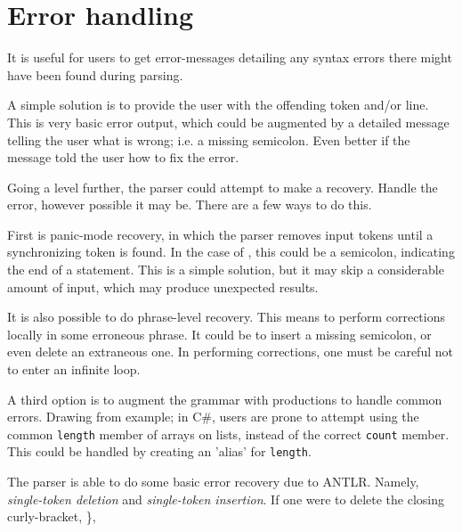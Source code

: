 \section{Error handling}
It is useful for users to get error-messages detailing any syntax errors there might have been found during parsing.

A simple solution is to provide the user with the offending token and/or line. This is very basic error output, which could be augmented by a detailed message telling the user what is wrong; i.e. a missing semicolon. Even better if the message told the user how to fix the error. 

Going a level further, the parser could attempt to make a recovery. Handle the error, however possible it may be. There are a few ways to do this.

First is panic-mode recovery, in which the parser removes input tokens until a synchronizing token is found. In the case of \dazel{}, this could be a semicolon, indicating the end of a statement. This is a simple solution, but it may skip a considerable amount of input, which may produce unexpected results\cite{crafting_a_compiler}.

It is also possible to do phrase-level recovery. This means to perform corrections locally in some erroneous phrase. It could be to insert a missing semicolon, or even delete an extraneous one. In performing corrections, one must be careful not to enter an infinite loop\cite{spo_course}.

A third option is to augment the grammar with productions to handle common errors\cite{spo_course}. Drawing from example; in C\#, users are prone to attempt using the common \texttt{length} member of arrays on lists, instead of the correct \texttt{count} member. This could be handled by creating an 'alias' for \texttt{length}.

The \dazel{} parser is able to do some basic error recovery due to ANTLR. Namely, \textit{single-token deletion} and \textit{single-token insertion}. If one were to delete the closing curly-bracket, \}, 